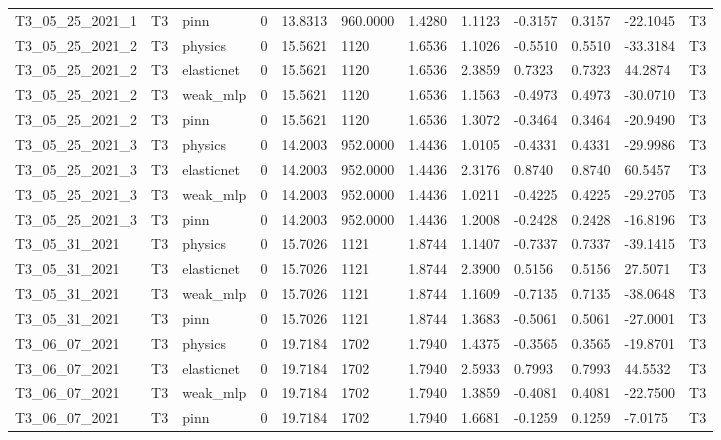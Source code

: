 \begin{table}[t]
\begin{tabular}{llllllllllll}
T3\_05\_25\_2021\_1 & T3 & pinn & 0 & 13.8313 & 960.0000 & 1.4280 & 1.1123 & -0.3157 & 0.3157 & -22.1045 & T3 \\
T3\_05\_25\_2021\_2 & T3 & physics & 0 & 15.5621 & 1120 & 1.6536 & 1.1026 & -0.5510 & 0.5510 & -33.3184 & T3 \\
T3\_05\_25\_2021\_2 & T3 & elasticnet & 0 & 15.5621 & 1120 & 1.6536 & 2.3859 & 0.7323 & 0.7323 & 44.2874 & T3 \\
T3\_05\_25\_2021\_2 & T3 & weak\_mlp & 0 & 15.5621 & 1120 & 1.6536 & 1.1563 & -0.4973 & 0.4973 & -30.0710 & T3 \\
T3\_05\_25\_2021\_2 & T3 & pinn & 0 & 15.5621 & 1120 & 1.6536 & 1.3072 & -0.3464 & 0.3464 & -20.9490 & T3 \\
T3\_05\_25\_2021\_3 & T3 & physics & 0 & 14.2003 & 952.0000 & 1.4436 & 1.0105 & -0.4331 & 0.4331 & -29.9986 & T3 \\
T3\_05\_25\_2021\_3 & T3 & elasticnet & 0 & 14.2003 & 952.0000 & 1.4436 & 2.3176 & 0.8740 & 0.8740 & 60.5457 & T3 \\
T3\_05\_25\_2021\_3 & T3 & weak\_mlp & 0 & 14.2003 & 952.0000 & 1.4436 & 1.0211 & -0.4225 & 0.4225 & -29.2705 & T3 \\
T3\_05\_25\_2021\_3 & T3 & pinn & 0 & 14.2003 & 952.0000 & 1.4436 & 1.2008 & -0.2428 & 0.2428 & -16.8196 & T3 \\
T3\_05\_31\_2021 & T3 & physics & 0 & 15.7026 & 1121 & 1.8744 & 1.1407 & -0.7337 & 0.7337 & -39.1415 & T3 \\
T3\_05\_31\_2021 & T3 & elasticnet & 0 & 15.7026 & 1121 & 1.8744 & 2.3900 & 0.5156 & 0.5156 & 27.5071 & T3 \\
T3\_05\_31\_2021 & T3 & weak\_mlp & 0 & 15.7026 & 1121 & 1.8744 & 1.1609 & -0.7135 & 0.7135 & -38.0648 & T3 \\
T3\_05\_31\_2021 & T3 & pinn & 0 & 15.7026 & 1121 & 1.8744 & 1.3683 & -0.5061 & 0.5061 & -27.0001 & T3 \\
T3\_06\_07\_2021 & T3 & physics & 0 & 19.7184 & 1702 & 1.7940 & 1.4375 & -0.3565 & 0.3565 & -19.8701 & T3 \\
T3\_06\_07\_2021 & T3 & elasticnet & 0 & 19.7184 & 1702 & 1.7940 & 2.5933 & 0.7993 & 0.7993 & 44.5532 & T3 \\
T3\_06\_07\_2021 & T3 & weak\_mlp & 0 & 19.7184 & 1702 & 1.7940 & 1.3859 & -0.4081 & 0.4081 & -22.7500 & T3 \\
T3\_06\_07\_2021 & T3 & pinn & 0 & 19.7184 & 1702 & 1.7940 & 1.6681 & -0.1259 & 0.1259 & -7.0175 & T3 \\
\hline
\end{tabular}
\end{table}

